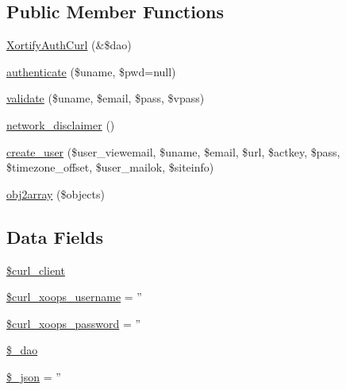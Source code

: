 \subsection*{Public Member Functions}
\begin{DoxyCompactItemize}
\item 
\hyperlink{class_xortify_auth_curl_a2430898abaead91368d79a7caa17a1b7}{Xortify\-Auth\-Curl} (\&\$dao)
\item 
\hyperlink{class_xortify_auth_curl_a00678ba307326b734e6c679f28bea315}{authenticate} (\$uname, \$pwd=null)
\item 
\hyperlink{class_xortify_auth_curl_a91121a1b702dfd20fb65a027c8ed26ec}{validate} (\$uname, \$email, \$pass, \$vpass)
\item 
\hyperlink{class_xortify_auth_curl_a1874c27b6f81a3f2ff9015405ad0f8bc}{network\-\_\-disclaimer} ()
\item 
\hyperlink{class_xortify_auth_curl_ac72efc5ad313a592cf6706876f56f7ec}{create\-\_\-user} (\$user\-\_\-viewemail, \$uname, \$email, \$url, \$actkey, \$pass, \$timezone\-\_\-offset, \$user\-\_\-mailok, \$siteinfo)
\item 
\hyperlink{class_xortify_auth_curl_aabc52e4f78557f0e0b360a8aaba6e11d}{obj2array} (\$objects)
\end{DoxyCompactItemize}
\subsection*{Data Fields}
\begin{DoxyCompactItemize}
\item 
\hyperlink{class_xortify_auth_curl_a402f2112991f3227835af80e9df33e38}{\$curl\-\_\-client}
\item 
\hyperlink{class_xortify_auth_curl_aab7480ba9f878a02b2c9fd43922fa070}{\$curl\-\_\-xoops\-\_\-username} = ''
\item 
\hyperlink{class_xortify_auth_curl_a6c9851541ed3826c67cfe7224c38f0b8}{\$curl\-\_\-xoops\-\_\-password} = ''
\item 
\hyperlink{class_xortify_auth_curl_a12a029c610f699b4b25e79a1f64a3485}{\$\-\_\-dao}
\item 
\hyperlink{class_xortify_auth_curl_a94787b37d92a2dee02534eed4f316589}{\$\-\_\-json} = ''
\end{DoxyCompactItemize}


